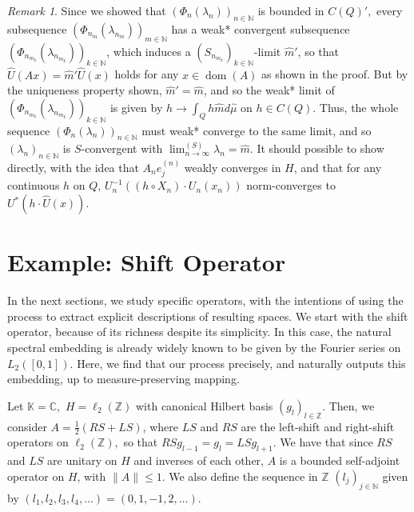 \documentclass{amsart}
\theoremstyle{definition}
\theoremstyle{remark}
\newtheorem{remark}[thm]{Remark}
\def \Dom{\operatorname{dom}}
\def \HMU{\hat{\mu}}
\def \HU{\hat{U}}
\def \Hm{\hat{m}}
\begin{document}
\begin{remark}\label{remark_convergent_eigenvalue}
	Since we showed that $(\Phi_n(\lambda_n))_{n\in\mathbb{N}}$ is bounded in $C(Q)',$ every subsequence $(\Phi_{n_m}(\lambda_{n_m}))_{m\in\mathbb{N}}$ has a weak* convergent subsequence $(\Phi_{n_{m_k}}(\lambda_{n_{m_k}}))_{k\in\mathbb{N}}$, which induces a $(S_{n_{m_k}})_{k\in\mathbb{N}}$-limit $\Hm'$, so that $\HU(Ax)=\Hm'\HU(x)$ holds for any $x\in\Dom(A)$ as shown in the proof. But by the uniqueness property shown, $\Hm'=\Hm$, and so the weak* limit of $(\Phi_{n_{m_k}}(\lambda_{n_{m_k}}))_{k\in\mathbb{N}}$ is given by $h\rightarrow\int_{Q}h\Hm d\HMU$ on $h\in C(Q).$ Thus, the whole sequence $(\Phi_n(\lambda_n))_{n\in\mathbb{N}}$ must weak* converge to the same limit, and so $(\lambda_n)_{n\in\mathbb{N}}$ is $S$-convergent with $\lim_{n\rightarrow\infty}^{(S)} \lambda_n = \Hm.$ It should possible to show directly, with the idea that $A_n e_j^{(n)}$ weakly converges in $H$, and that for any continuous $h$ on $Q$, $U_n^{-1}((h\circ X_n)\cdot U_n (x_n))$ norm-converges to $U^*(h\cdot \HU(x))$. %
\end{remark}

\section{Example: Shift Operator}\label{section_shift}

In the next sections, we study specific operators, with the intentions of using the process to extract explicit descriptions of resulting spaces. We start with the shift operator, because of its richness despite its simplicity. In this case, the natural spectral embedding is already  widely known to be given by the Fourier series on $L_2([0,1])$. Here, we find that our process precisely, and naturally outputs this embedding, up to measure-preserving mapping.

Let $\mathbb{K}=\mathbb{C},$ $H=\ell_2(\mathbb{Z})$ with canonical Hilbert basis $(g_l)_{l\in\mathbb{Z}}$. Then, we consider $A=\frac{1}{2}(RS+LS)$, where $LS$ and $RS$ are the left-shift and right-shift operators on $\ell_2(\mathbb{Z}),$ so that $RSg_{l-1}=g_{l}=LSg_{l+1}$. We have that since $RS$ and $LS$  are unitary on $H$ and inverses of each other, $A$ is a bounded self-adjoint operator on $H$, with $\|A\|\leq 1$. We also define the sequence in $\mathbb{Z}$ $(l_j)_{j\in\mathbb{N}}$ given by $(l_1,l_2,l_3,l_4,\dots)=(0,1,-1,2,\dots).$
\end{document}
